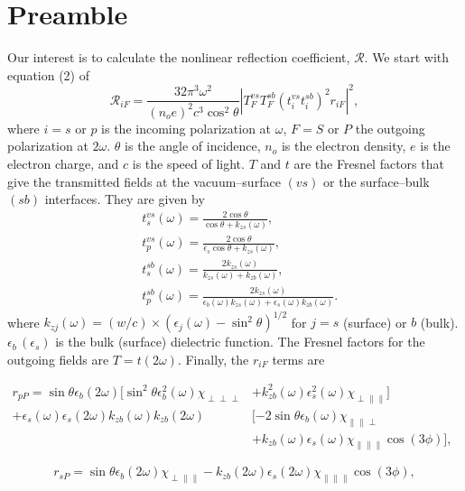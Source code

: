 \documentclass[10pt]{article}
\begin{document}
\section{Preamble}
Our interest is to calculate the nonlinear reflection coefficient, $\mathcal{R}$. We start with equation (2) of \cite{mejiaPRB02}
\begin{equation}
\mathcal{R}_{iF} = \frac{32\pi^{3}\omega^{2}}{(n_{o}e)^{2}c^{3}\cos^{2}\theta}\left\vert T^{vs}_{F}T^{sb}_{F}(t^{vs}_{i}t^{sb}_{i})^{2}r_{iF}\right\vert^{2},
\end{equation}
where $i=s$ or $p$ is the incoming polarization at $\omega$, $F=S$ or $P$ the outgoing polarization at $2\omega$. $\theta$ is the angle of incidence, $n_{o}$ is the electron density, $e$ is the electron charge, and $c$ is the speed of light. $T$ and $t$ are the Fresnel factors that give the transmitted fields at the vacuum--surface $(vs)$ or the surface--bulk $(sb)$ interfaces. They are given by
\begin{align}
&t^{vs}_{s}(\omega) = \frac{2\cos\theta}{\cos\theta + k_{zs}(\omega)},\label{tvss}\\
&t^{vs}_{p}(\omega) = \frac{2\cos\theta}{\epsilon_{s}\cos\theta + k_{zs}(\omega)},\label{tvsp}\\
&t^{sb}_{s}(\omega) = \frac{2k_{zs}(\omega)}{k_{zs}(\omega) + k_{zb}(\omega)},\label{tsbs}\\
&t^{sb}_{p}(\omega) = \frac{2k_{zs}(\omega)}{\epsilon_{b}(\omega)k_{zs}(\omega) + \epsilon_{s}(\omega)k_{zb}(\omega)}.\label{tsbp}
\end{align}
where $k_{zj}(\omega) = (w/c)\times(\epsilon_{j}(\omega) - \sin^{2}\theta)^{1/2}$ for $j=s$ (surface) or $b$ (bulk). $\epsilon_{b}\,(\epsilon_{s})$ is the bulk (surface) dielectric function. The Fresnel factors for the outgoing fields are $T=t(2\omega)$. Finally, the $r_{iF}$ terms are

\begin{align*}
r_{pP} = \sin\theta\epsilon_{b}(2\omega)[\sin^{2}\theta\epsilon^{2}_{b}(\omega)\chi_{\perp\perp\perp} &+ k^{2}_{zb}(\omega)\epsilon^{2}_{s}(\omega)\chi_{\perp\parallel\parallel}] \nonumber \\
+ \epsilon_{s}(\omega)\epsilon_{s}(2\omega)k_{zb}(\omega)k_{zb}(2\omega)&[-2\sin\theta\epsilon_{b}(\omega)\chi_{\parallel\parallel\perp}&\\
&+ k_{zb}(\omega)\epsilon_{s}(\omega)\chi_{\parallel\parallel\parallel}\cos(3\phi)], \nonumber
\end{align*}

\begin{equation*}
r_{sP} = \sin\theta\epsilon_{b}(2\omega)\chi_{\perp\parallel\parallel} - k_{zb}(2\omega)\epsilon_{s}(2\omega)\chi_{\parallel\parallel\parallel}\cos(3\phi),
\end{equation*}
\end{document}
